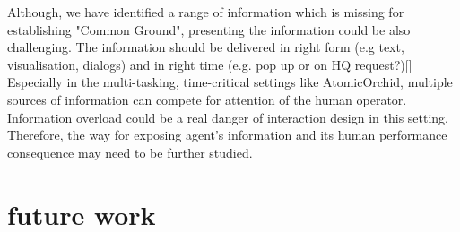 Although, we have identified a range of information which is missing for establishing "Common Ground", presenting the information could be also challenging. The information should be delivered in right form (e.g text, visualisation, dialogs) and in right time (e.g. pop up or on HQ request?)[] Especially in the multi-tasking, time-critical settings like AtomicOrchid, multiple sources of information can compete for attention of the human operator. Information overload could be a real danger of interaction design in this setting. Therefore, the  way for exposing agent's information and its human performance consequence may need to be further studied.   \\



\section{future work}

